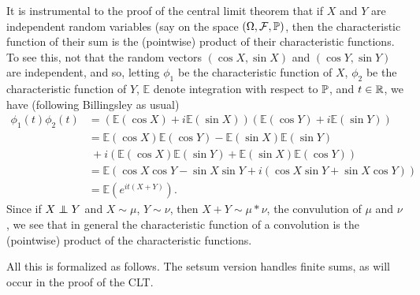 \documentclass[leqno]{article}
\theoremstyle{definition}
\renewcommand{\E}{\mathbb E}
\newcommand\indep{\protect\mathpalette{\protect\independenT}{\perp}}
\def\independenT#1#2{\mathrel{\rlap{$#1#2$}\mkern2mu{#1#2}}}
\begin{document}
\medskip

It is instrumental to the proof of the central limit theorem that if $X$ and $Y$ are independent random variables (say on the space $(\Omega, \mathcal F, \P)$, then the characteristic function of their sum is the (pointwise) product of their characteristic functions. To see this, not that the random vectors $(\cos X, \sin X)$ and $(\cos Y, \sin Y)$ are independent, and so, letting $\phi_1$ be the characteristic function of $X$, $\phi_2$ be the characteristic function of $Y$, $\E$ denote integration with respect to $\P$, and $t \in \R$, we have (following Billingsley \cite{billingsley} as usual)
\begin{align*}
\phi_1(t)\phi_2(t) &= (\E(\cos X) + i\E(\sin X))(\E(\cos Y) + i\E(\sin Y)) \\
                   &= \E(\cos X) \E(\cos Y) - \E(\sin X)\E(\sin Y) \\
                   & \ + i(\E(\cos X)\E(\sin Y) + \E(\sin X)\E(\cos Y)) \\
                   &= \E(\cos X \cos Y - \sin X \sin Y + i(\cos X \sin Y + \sin X \cos Y)) \\
                   &= \E(e^{it(X + Y)}).
\end{align*}
Since if $X \indep Y$ and $X \sim \mu$, $Y \sim \nu$, then $X + Y \sim \mu * \nu$, the convulution of $\mu$ and $\nu$, we see that in general the characteristic function of a convolution is the (pointwise) product of the characteristic functions.

All this is formalized as follows. The setsum version handles finite sums, as will occur in the proof of the CLT.\phantom{)}

\medskip
\end{document}
